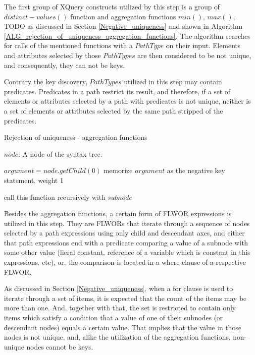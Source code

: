 The first group of XQuery constructs utilized by this step is a group of $distinct-values()$ function and aggregation functions $min()$, $max()$, TODO  as discussed in Section \ref{Negative_uniqueness} and shown in Algorithm \ref{ALG_rejection_of_uniqueness_aggregation_functions}. The algorithm searches for calls of the mentioned functions with a $PathType$ on their input. Elements and attributes selected by those $PathTypes$ are then considered to be not unique, and consequently, they can not be keys.

Contrary the key discovery, $PathTypes$ utilized in this step may contain predicates. Predicates in a path restrict its result, and therefore, if a set of elements or attributes selected by a path with predicates is not unique, neither is a set of elements or attributes selected by the same path stripped of the predicates. 

\begin{algorithm}
\caption{Rejection of uniqueness - aggregation functions}
\label{ALG_rejection_of_uniqueness_aggregation_functions}
\begin{algorithmic}[1]
\REQUIRE $node$: A node of the syntax tree.

        \STATE $argument = node.getChild(0)$
            \STATE memorize $argument$ as the negative key statement, weight 1
        \ENDIF
    \ENDIF
\ENDIF

    \STATE call this function recursively with $subnode$
\ENDFOR

\end{algorithmic}
\end{algorithm}

Besides the aggregation functions, a certain form of FLWOR expressions is utilized in this step. They are FLWORs that iterate through a sequence of nodes selected by a path expressions using only child and descendant axes, and either that path expressions end with a predicate comparing a value of a subnode with some other value (lieral constant, reference of a variable which is constant in this expressions, etc), or, the comparison is located in a where clause of a respective FLWOR.

As discussed in Section \ref{Negative_uniqueness}, when a for clause is used to iterate through a set of items, it is expected that the count of the items may be more than one. And, together with that, the set is restricted to contain only items which satisfy a condition that a value of one of their subnodes (or descendant nodes) equals a certain value. That implies that the value in those nodes is not unique, and, alike the utilization of the aggregation functions, non-unique nodes cannot be keys.

